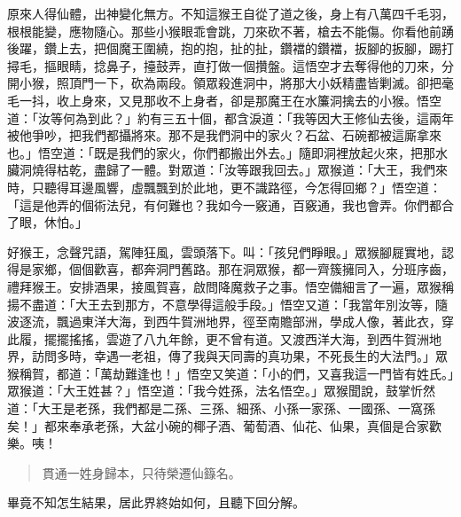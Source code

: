 原來人得仙體，出神變化無方。不知這猴王自從了道之後，身上有八萬四千毛羽，根根能變，應物隨心。那些小猴眼乖會跳，刀來砍不著，槍去不能傷。你看他前踴後躍，鑽上去，把個魔王圍繞，抱的抱，扯的扯，鑽襠的鑽襠，扳腳的扳腳，踢打撏毛，摳眼睛，捻鼻子，擡鼓弄，直打做一個攢盤。這悟空才去奪得他的刀來，分開小猴，照頂門一下，砍為兩段。領眾殺進洞中，將那大小妖精盡皆剿滅。卻把毫毛一抖，收上身來，又見那收不上身者，卻是那魔王在水簾洞擒去的小猴。悟空道：「汝等何為到此？」約有三五十個，都含淚道：「我等因大王修仙去後，這兩年被他爭吵，把我們都攝將來。那不是我們洞中的家火？石盆、石碗都被這廝拿來也。」悟空道：「既是我們的家火，你們都搬出外去。」隨即洞裡放起火來，把那水臟洞燒得枯乾，盡歸了一體。對眾道：「汝等跟我回去。」眾猴道：「大王，我們來時，只聽得耳邊風響，虛飄飄到於此地，更不識路徑，今怎得回鄉？」悟空道：「這是他弄的個術法兒，有何難也？我如今一竅通，百竅通，我也會弄。你們都合了眼，休怕。」

好猴王，念聲咒語，駕陣狂風，雲頭落下。叫：「孩兒們睜眼。」眾猴腳屣實地，認得是家鄉，個個歡喜，都奔洞門舊路。那在洞眾猴，都一齊簇擁同入，分班序齒，禮拜猴王。安排酒果，接風賀喜，啟問降魔救子之事。悟空備細言了一遍，眾猴稱揚不盡道：「大王去到那方，不意學得這般手段。」悟空又道：「我當年別汝等，隨波逐流，飄過東洋大海，到西牛賀洲地界，徑至南贍部洲，學成人像，著此衣，穿此履，擺擺搖搖，雲遊了八九年餘，更不曾有道。又渡西洋大海，到西牛賀洲地界，訪問多時，幸遇一老祖，傳了我與天同壽的真功果，不死長生的大法門。」眾猴稱賀，都道：「萬劫難逢也！」悟空又笑道：「小的們，又喜我這一門皆有姓氏。」眾猴道：「大王姓甚？」悟空道：「我今姓孫，法名悟空。」眾猴聞說，鼓掌忻然道：「大王是老孫，我們都是二孫、三孫、細孫、小孫一家孫、一國孫、一窩孫矣！」都來奉承老孫，大盆小碗的椰子酒、葡萄酒、仙花、仙果，真個是合家歡樂。咦！
\begin{quote}
貫通一姓身歸本，只待榮遷仙籙名。
\end{quote}

畢竟不知怎生結果，居此界終始如何，且聽下回分解。
